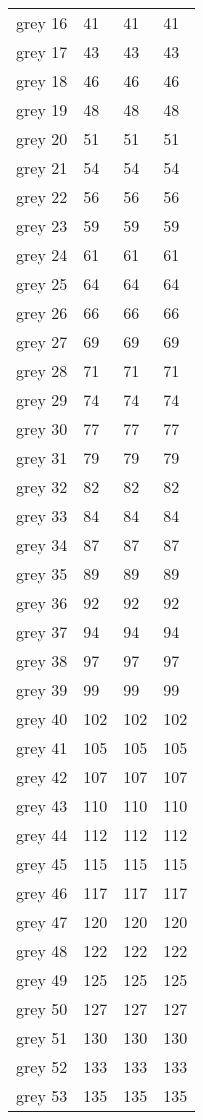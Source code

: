 \begin{center}
\begin{tabular}{llll}
  grey 16 & 41 & 41 & 41  \\
  grey 17 & 43 & 43 & 43  \\
  grey 18 & 46 & 46 & 46  \\
  grey 19 & 48 & 48 & 48  \\
  grey 20 & 51 & 51 & 51  \\
  grey 21 & 54 & 54 & 54  \\
  grey 22 & 56 & 56 & 56  \\
  grey 23 & 59 & 59 & 59  \\
  grey 24 & 61 & 61 & 61  \\
  grey 25 & 64 & 64 & 64  \\
  grey 26 & 66 & 66 & 66  \\
  grey 27 & 69 & 69 & 69  \\
  grey 28 & 71 & 71 & 71  \\
  grey 29 & 74 & 74 & 74  \\
  grey 30 & 77 & 77 & 77  \\
  grey 31 & 79 & 79 & 79  \\
  grey 32 & 82 & 82 & 82  \\
  grey 33 & 84 & 84 & 84  \\
  grey 34 & 87 & 87 & 87  \\
  grey 35 & 89 & 89 & 89  \\
  grey 36 & 92 & 92 & 92  \\
  grey 37 & 94 & 94 & 94  \\
  grey 38 & 97 & 97 & 97  \\
  grey 39 & 99 & 99 & 99  \\
  grey 40 & 102 & 102 & 102  \\
  grey 41 & 105 & 105 & 105  \\
  grey 42 & 107 & 107 & 107  \\
  grey 43 & 110 & 110 & 110  \\
  grey 44 & 112 & 112 & 112  \\
  grey 45 & 115 & 115 & 115  \\
  grey 46 & 117 & 117 & 117  \\
  grey 47 & 120 & 120 & 120  \\
  grey 48 & 122 & 122 & 122  \\
  grey 49 & 125 & 125 & 125  \\
  grey 50 & 127 & 127 & 127  \\
  grey 51 & 130 & 130 & 130  \\
  grey 52 & 133 & 133 & 133  \\
  grey 53 & 135 & 135 & 135  \\

\end{tabular}
\end{center}
